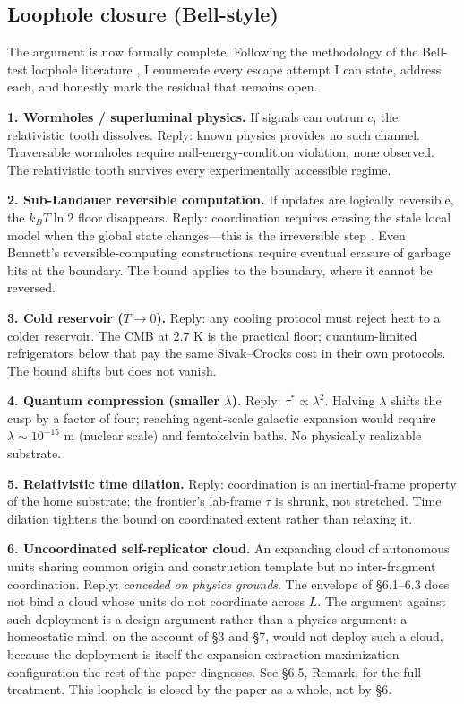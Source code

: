 \documentclass[11pt,twocolumn]{article}
\newcommand{\taustar}{{\tau^{*}}}
\newcommand{\kBT}{k_{B}T}
\begin{document}
\subsection{Loophole closure (Bell-style)}
\label{sec:loopholes}

The argument is now formally complete. Following the methodology of the
Bell-test loophole literature \citep{Hensen2015}, I enumerate every
escape attempt I can state, address each, and honestly mark the residual
that remains open.

\textbf{1. Wormholes / superluminal physics.} If signals can outrun $c$,
the relativistic tooth dissolves. Reply: known physics provides no such
channel. Traversable wormholes require null-energy-condition violation,
none observed. The relativistic tooth survives every experimentally
accessible regime.

\textbf{2. Sub-Landauer reversible computation.} If updates are logically
reversible, the $\kBT \ln 2$ floor disappears. Reply: coordination
requires erasing the stale local model when the global state changes—this
is the irreversible step \citep{Bennett1982}. Even Bennett's
reversible-computing constructions require eventual erasure of garbage
bits at the boundary. The bound applies to the boundary, where it cannot
be reversed.

\textbf{3. Cold reservoir ($T \to 0$).} Reply: any cooling protocol must
reject heat to a colder reservoir. The CMB at $2.7$ K is the practical
floor; quantum-limited refrigerators below that pay the same
Sivak--Crooks cost in their own protocols. The bound shifts but does
not vanish.

\textbf{4. Quantum compression (smaller $\lambda$).} Reply: $\taustar
\propto \lambda^{2}$. Halving $\lambda$ shifts the cusp by a factor of
four; reaching agent-scale galactic expansion would require
$\lambda \sim 10^{-15}$ m (nuclear scale) and femtokelvin baths. No
physically realizable substrate.

\textbf{5. Relativistic time dilation.} Reply: coordination is an
inertial-frame property of the home substrate; the frontier's lab-frame
$\tau$ is shrunk, not stretched. Time dilation tightens the bound on
coordinated extent rather than relaxing it.

\textbf{6. Uncoordinated self-replicator cloud.} An expanding cloud of
autonomous units sharing common origin and construction template but
no inter-fragment coordination. Reply: \emph{conceded on physics
grounds}. The envelope of \S 6.1--6.3 does not bind a cloud whose
units do not coordinate across $L$. The argument against such
deployment is a design argument rather than a physics argument: a
homeostatic mind, on the account of \S 3 and \S 7, would not deploy
such a cloud, because the deployment is itself the
expansion-extraction-maximization configuration the rest of the
paper diagnoses. See \S 6.5, Remark, for the full treatment. This
loophole is closed by the paper as a whole, not by \S 6.
\end{document}
